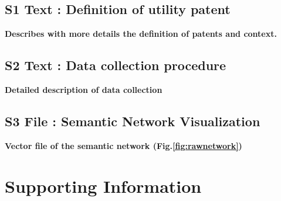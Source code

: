 \documentclass[10pt,A4]{article}
\begin{document}
\subsection*{S1 Text : Definition of utility patent}

\textbf{Describes with more details the definition of patents and  context.}

\subsection*{S2 Text : Data collection procedure}

\textbf{Detailed description of data collection}

\subsection*{S3 File : Semantic Network Visualization}

\textbf{Vector file of the semantic network (Fig.\ref{fig:rawnetwork})}









\nolinenumbers

%
%
% 










\newpage

\section*{Supporting Information \label{sectionSI}}
\end{document}

